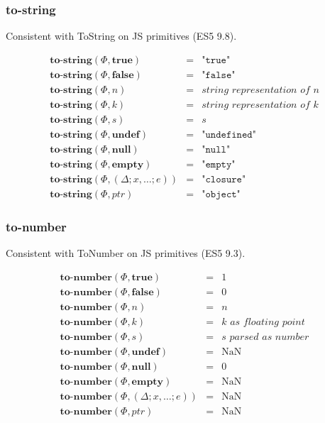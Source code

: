 \documentclass[draft, 10pt]{article}
\newcommand{\expr}[0]{e}
\newcommand{\var}[0]{x}
\newcommand{\num}[0]{n}
\newcommand{\intg}[0]{k}
\newcommand{\str}[0]{s}
\newcommand{\nan}[0]{\textrm{NaN}}
\newcommand{\undef}[0]{\textbf{undef}}
\newcommand{\nul}[0]{\textbf{null}}
\newcommand{\empt}[0]{\textbf{empty}}
\newcommand{\true}[0]{\textbf{true}}
\newcommand{\false}[0]{\textbf{false}}
\newcommand{\optostr}[0]{\textbf{to-string}}
\newcommand{\optonum}[0]{\textbf{to-number}}
\newcommand{\varenv}[0]{\Delta}
\newcommand{\heap}[0]{\Phi}
\newcommand{\closure}[3]{(#1; #2; #3)}
\newcommand{\heapptr}{ptr}
\newcommand{\rununop}[3]{#1(#2,#3)}
\begin{document}
\subsubsection{to-string}

Consistent with ToString on JS primitives (ES5 9.8).

\[
\begin{array}{rcl}
\rununop{\optostr}{\heap}{\true} &=& \texttt{"true"} \\
\rununop{\optostr}{\heap}{\false} &=& \texttt{"false"} \\
\rununop{\optostr}{\heap}{\num} &=& \textit{string representation of $\num$} \\
\rununop{\optostr}{\heap}{\intg} &=& \textit{string representation of $\intg$} \\
\rununop{\optostr}{\heap}{\str} &=& \str \\
\rununop{\optostr}{\heap}{\undef} &=& \texttt{"undefined"} \\
\rununop{\optostr}{\heap}{\nul} &=& \texttt{"null"} \\
\rununop{\optostr}{\heap}{\empt} &=& \texttt{"empty"} \\
\rununop{\optostr}{\heap}{\closure{\varenv}{\var, \dots}{\expr}} &=& \texttt{"closure"} \\
\rununop{\optostr}{\heap}{\heapptr} &=& \texttt{"object"} 
\end{array}
\]

\subsubsection{to-number}

Consistent with ToNumber on JS primitives (ES5 9.3).

\[
\begin{array}{rcl}
\rununop{\optonum}{\heap}{\true} &=& 1 \\
\rununop{\optonum}{\heap}{\false} &=& 0 \\
\rununop{\optonum}{\heap}{\num} &=& \num \\
\rununop{\optonum}{\heap}{\intg} &=& \textit{$\intg$ as floating point} \\
\rununop{\optonum}{\heap}{\str} &=& \textit{$\str$ parsed as number} \\
\rununop{\optonum}{\heap}{\undef} &=& \nan \\
\rununop{\optonum}{\heap}{\nul} &=& 0 \\
\rununop{\optonum}{\heap}{\empt} &=& \nan \\
\rununop{\optonum}{\heap}{\closure{\varenv}{\var, \dots}{\expr}} &=& \nan \\
\rununop{\optonum}{\heap}{\heapptr} &=& \nan 
\end{array}
\]
\end{document}
